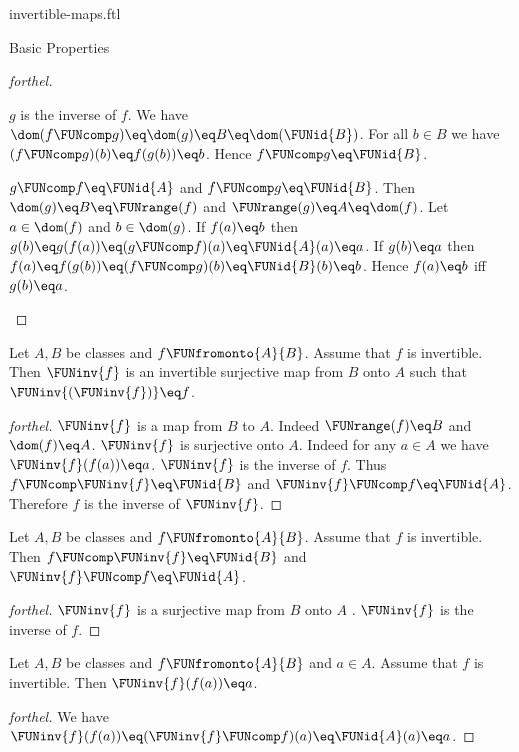 \documentclass{naproche-library}
\begin{document}
\begin{smodule}[title=Invertible Maps]{invertible-maps.ftl}
\begin{sfragment}{Basic Properties}
\begin{proof}[forthel]
\begin{case}{$g$ is the inverse of $f$.}
      We have
      $\dom(f \FUNcomp g)
        \eq \dom(g)
        \eq B
        \eq \dom(\FUNid{B})$.
      For all $b \in B$ we have
      $(f \FUNcomp g)(b)
        \eq f(g(b))
        \eq b$.
      Hence $f \FUNcomp g \eq \FUNid{B}$.
    \end{case}

    \begin{case}{$g \FUNcomp f \eq \FUNid{A}$ and $f \FUNcomp g \eq \FUNid{B}$.}
      Then $\dom(g)
        \eq B
        \eq \FUNrange(f)$
      and $\FUNrange(g)
        \eq A
        \eq \dom(f)$.
      Let $a \in \dom(f)$ and $b \in \dom(g)$.
      If $f(a) \eq b$ then
      $g(b)
        \eq g(f(a))
        \eq (g \FUNcomp f)(a)
        \eq \FUNid{A}(a)
        \eq a$.
      If $g(b) \eq a$ then
      $f(a)
        \eq f(g(b))
        \eq (f \FUNcomp g)(b)
        \eq \FUNid{B}(b)
        \eq b$.
      Hence $f(a) \eq b$ iff $g(b) \eq a$.
    \end{case}
  \end{proof}

  \begin{proposition}[forthel,id=FOUNDATIONS_09_8414736098000896]
    Let $A, B$ be classes and $f \FUNfromonto{A}{B}$.
    Assume that $f$ is invertible.
    Then $\FUNinv{f}$ is an invertible surjective map from $B$ onto $A$ such that $\FUNinv{(\FUNinv{f})} \eq f$.
  \end{proposition}
  \begin{proof}[forthel]
    $\FUNinv{f}$ is a map from $B$ to $A$.
    Indeed $\FUNrange(f) \eq B$ and $\dom(f) \eq A$.
    $\FUNinv{f}$ is surjective onto $A$.
    Indeed for any $a \in A$ we have $\FUNinv{f}(f(a)) \eq a$.
    $\FUNinv{f}$ is the inverse of $f$.
    Thus $f \FUNcomp \FUNinv{f} \eq \FUNid{B}$ and $\FUNinv{f} \FUNcomp f \eq \FUNid{A}$.
    Therefore $f$ is the inverse of $\FUNinv{f}$.
  \end{proof}

  \begin{proposition}[forthel,id=FOUNDATIONS_09_4577560740495360]
    Let $A, B$ be classes and $f \FUNfromonto{A}{B}$.
    Assume that $f$ is invertible.
    Then $f \FUNcomp \FUNinv{f} \eq \FUNid{B}$ and $\FUNinv{f} \FUNcomp f \eq \FUNid{A}$.
  \end{proposition}
  \begin{proof}[forthel]
    $\FUNinv{f}$ is a surjective map from $B$ onto $A$ .
    $\FUNinv{f}$ is the inverse of $f$.
  \end{proof}

  \begin{proposition}[forthel,id=FOUNDATIONS_09_4606651604664320]
    Let $A, B$ be classes and $f \FUNfromonto{A}{B}$ and $a \in A$.
    Assume that $f$ is invertible.
    Then $\FUNinv{f}(f(a)) \eq a$.
  \end{proposition}
  \begin{proof}[forthel]
    We have $\FUNinv{f}(f(a)) \eq (\FUNinv{f} \FUNcomp f)(a) \eq \FUNid{A}(a) \eq a$.
  \end{proof}


\end{sfragment}
\end{smodule}
\end{document}
